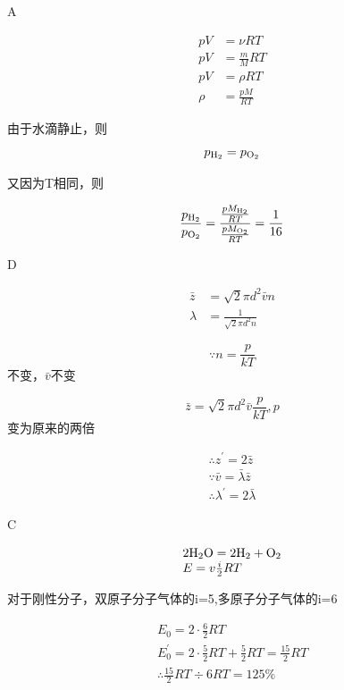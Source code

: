 \exercise A

\solve

$$
\begin{aligned} 
p V & = \nu R T \\ p V & = \frac { m } { M } R T \\
p V & = \rho R T \\
\rho & = \frac { p M } { R T }
\end{aligned}
$$

由于水滴静止，则
$$
p_{\ce{H2}} =p_{\ce{O2}}
$$

又因为T相同，则

$$
\frac { p_{\ce{H2}} } { p _{\ce{O2}} } = \frac { \frac { p M _ {\ce{H2}} } { R T } } { \frac { p M_{\ce{O2}}}{ R T}}=\frac{1}{16}
$$

\exercise D

\solve

$$
\begin{aligned}
 \bar { z } & = \sqrt { 2 } \pi d ^ { 2 } \bar { v } n \\ \lambda & = \frac { 1 } { \sqrt { 2 } \pi d ^ { 2 } n } 
\end{aligned}
$$

$$
\because n = \frac { p } { k T }
$$不变，$ \bar { v }$不变

$$
\bar { z } = \sqrt { 2 } \pi d ^ { 2 } \bar { v } \frac { p } { k T },p
$$变为原来的两倍

$$
\begin{array} { l } 
{ \therefore z ^ { \prime } = 2 \bar { z } } \\ 
{ \because \bar { v } = \bar { \lambda } \bar { z } } \\
 { \therefore \lambda ^ { \prime } = 2 \bar { \lambda } }
\end{array}
$$

\exercise C

\solve

$$
\begin{array} { l } 
{ 2\ce{H2O} = 2\ce{H2}+\ce{O2}}\\
{ E = v\frac{i}{2}RT} 
\end{array}
$$

对于刚性分子，双原子分子气体的i=5,多原子分子气体的i=6

$$
\begin{array} { l }
 E _ { 0 } = 2 \cdot \frac { 6 } { 2 } R T \\ E _ { 0 } ^ { \prime } = 2 \cdot \frac { 5 } { 2 } R T + \frac { 5 } { 2 } R T = \frac { 15 } { 2 } R T \\ \therefore \frac { 15 } { 2 } R T \div 6 R T = 125 \% 
\end{array}
$$

